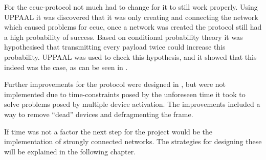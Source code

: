 \bigskip \noindent
For the \acrshort{ccuc}-protocol not much had to change for it to still work properly.
Using UPPAAL it was discovered that it was only creating and connecting the network which caused problems for \acrshort{ccuc}, once a network was created the protocol still had a high probability of success.
Based on conditional probability theory it was hypothesised that transmitting every payload twice could increase this probability.
UPPAAL was used to check this hypothesis, and it showed that this indeed was the case, as can be seen in .

Further improvements for the protocol were designed in , but were not implemented due to time-constraints posed by the unforeseen time it took to solve problems posed by multiple device activation.
The improvements included a way to remove \enquote{dead} devices and defragmenting the frame.

\bigskip \noindent
If time was not a factor the next step for the project would be the implementation of strongly connected networks.
The strategies for designing these will be explained in the following chapter.
